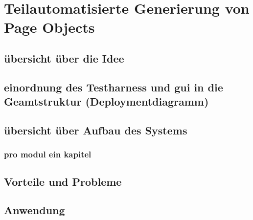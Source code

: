 \chapter{Teilautomatisierte Generierung von Page Objects}
\label{sec:teilautomatisierte_generierung_von_pageObjects}


\section{übersicht über die Idee}

\section{einordnung des Testharness und gui in die Geamtstruktur (Deploymentdiagramm)}

\section{übersicht über Aufbau des Systems}

\subsection{pro modul ein kapitel}

\section{Vorteile und Probleme}

\section{Anwendung}
